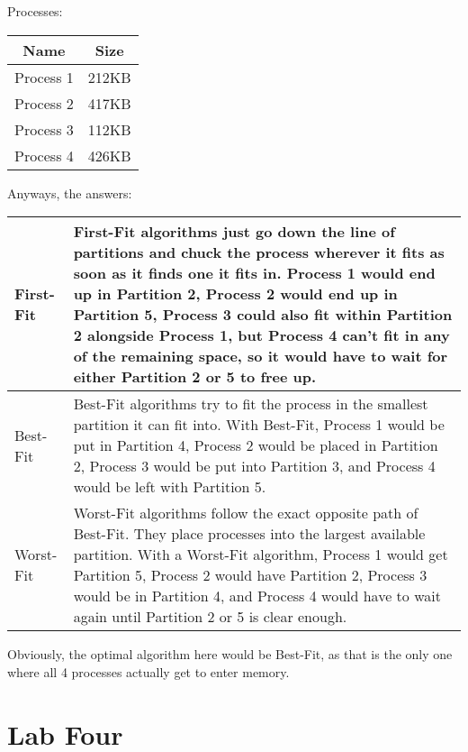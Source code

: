 \documentclass[letterpaper, 10pt,DIV=13]{scrartcl}
\numberwithin{equation}{section} %
\numberwithin{figure}{section} %
\numberwithin{table}{section} %
\begin{document}
\begin{center}
Processes:
\newline
\begin{tabular}{ |c|c| } 
\hline
Name & Size \\
\hline
\hline
Process 1 & 212KB \\
\hline
Process 2 & 417KB \\
\hline
Process 3 & 112KB \\
\hline
Process 4 & 426KB \\
\hline
\end{tabular}
\end{center}

Anyways, the answers:
\newline

\begin{center}
\begin{tabularx}{\textwidth}{| l |X|}
\hline
First-Fit & First-Fit algorithms just go down the line of partitions and chuck the process wherever it fits as soon as it finds one it fits in. Process 1 would end up in Partition 2, Process 2 would end up in Partition 5, Process 3 could also fit within Partition 2 alongside Process 1, but Process 4 can't fit in any of the remaining space, so it would have to wait for either Partition 2 or 5 to free up. \\ 
\hline
Best-Fit & Best-Fit algorithms try to fit the process in the smallest partition it can fit into. With Best-Fit, Process 1 would be put in Partition 4, Process 2 would be placed in Partition 2, Process 3 would be put into Partition 3, and Process 4 would be left with Partition 5.\\ 
\hline
Worst-Fit & Worst-Fit algorithms follow the exact opposite path of Best-Fit. They place processes into the largest available partition. With a Worst-Fit algorithm, Process 1 would get Partition 5, Process 2 would have Partition 2, Process 3 would be in Partition 4, and Process 4 would have to wait again until Partition 2 or 5 is clear enough.\\ 
\hline
\end{tabularx}
\end{center}
Obviously, the optimal algorithm here would be Best-Fit, as that is the only one where all 4 processes actually get to enter memory.

\pagebreak

\section{Lab Four}
\end{document}
